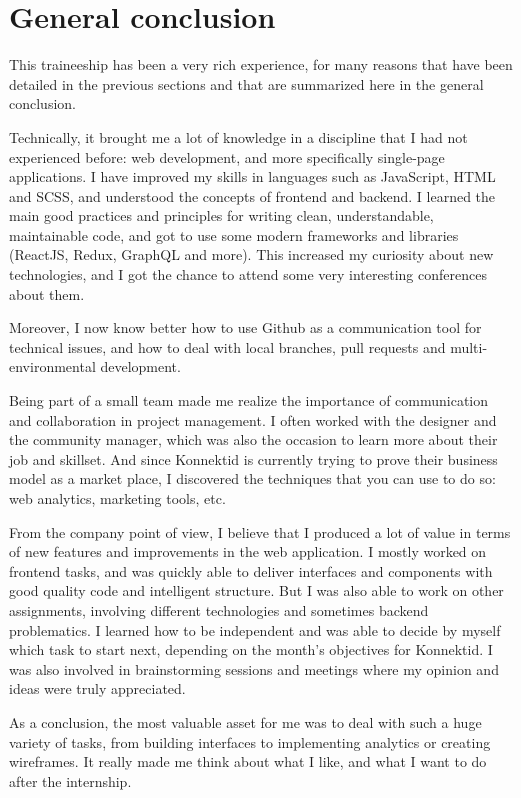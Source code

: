 \section{General conclusion}
\label{sec:conclusion}

This traineeship has been a very rich experience, for many reasons that have been detailed in the previous sections and that are summarized here in the general conclusion.

Technically, it brought me a lot of knowledge in a discipline that I had not experienced before: web development, and more specifically single-page applications. I have improved my skills in languages such as JavaScript, HTML and SCSS, and understood the concepts of frontend and backend. I learned the main good practices and principles for writing clean, understandable, maintainable code, and got to use some modern frameworks and libraries (ReactJS, Redux, GraphQL and more). This increased my curiosity about new technologies, and I got the chance to attend some very interesting conferences about them.

Moreover, I now know better how to use Github as a communication tool for technical issues, and how to deal with local branches, pull requests and multi-environmental development.

Being part of a small team made me realize the importance of communication and collaboration in project management. I often worked with the designer and the community manager, which was also the occasion to learn more about their job and skillset. And since Konnektid is currently trying to prove their business model as a market place, I discovered the techniques that you can use to do so: web analytics, marketing tools, etc.

From the company point of view, I believe that I produced a lot of value in terms of new features and improvements in the web application. I mostly worked on frontend tasks, and was quickly able to deliver interfaces and components with good quality code and intelligent structure. But I was also able to work on other assignments, involving different technologies and sometimes backend problematics. I learned how to be independent and was able to decide by myself which task to start next, depending on the month's objectives for Konnektid. I was also involved in brainstorming sessions and meetings where my opinion and ideas were truly appreciated.

As a conclusion, the most valuable asset for me was to deal with such a huge variety of tasks, from building interfaces to implementing analytics or creating wireframes. It really made me think about what I like, and what I want to do after the internship.